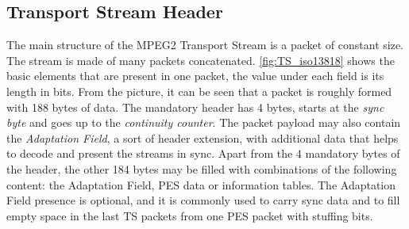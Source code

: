 \documentclass[12pt,a4paper]{article}
\begin{document}
\subsection{Transport Stream Header}
\label{ts_header}

The main structure of the MPEG2 Transport Stream is a packet of constant size. The stream is made of many packets concatenated. \autoref{fig:TS_iso13818} shows the basic elements that are present in one packet, the value under each field is its length in bits. From the picture, it can be seen that a packet is roughly formed with 188 bytes of data. The mandatory header has 4 bytes, starts at the \textit{sync byte} and goes up to the \textit{continuity counter}. The packet payload may also contain the \textit{Adaptation Field}, a sort of header extension, with additional data that helps to decode and present the streams in sync. Apart from the 4 mandatory bytes of the header, the other 184 bytes may be filled with combinations of the following content: the Adaptation Field, PES data or information tables. The Adaptation Field presence is optional, and it is commonly used to carry sync data and to fill empty space in the last TS packets from one PES packet with stuffing bits.
\end{document}
